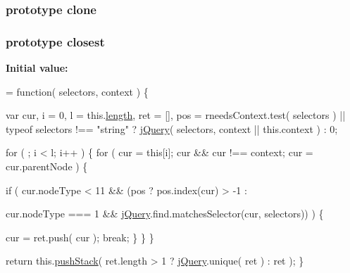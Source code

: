 \hypertarget{jquery-1_810_82-vsdoc_8js_a7d74ce76585989b4b6e2d506577e13ad}{
\subsubsection[{clone}]{ {\bf prototype} clone}}\label{jquery-1_810_82-vsdoc_8js_a7d74ce76585989b4b6e2d506577e13ad}
\hypertarget{jquery-1_810_82-vsdoc_8js_aff450c9c255a1867a5677efa5bed8765}{
\subsubsection[{closest}]{ {\bf prototype} closest}}\label{jquery-1_810_82-vsdoc_8js_aff450c9c255a1867a5677efa5bed8765}
{\bfseries Initial value\-:}
\begin{DoxyCode}
= \textcolor{keyword}{function}( selectors, context ) \{


        var cur,
            i = 0,
            l = this.\hyperlink{jquery-1_810_82-vsdoc_8js_aa7de35d58da66d9944ab9cbe82c19640}{length},
            ret = [],
            pos = rneedsContext.test( selectors ) || typeof selectors !== \textcolor{stringliteral}{"string"} ?
                \hyperlink{jquery-1_810_82-vsdoc_8js_add5237586d970a38a81f990e8eb28c6c}{jQuery}( selectors, context || this.context ) :
                0;

        \textcolor{keywordflow}{for} ( ; i < l; i++ ) \{
            \textcolor{keywordflow}{for} ( cur = \textcolor{keyword}{this}[i]; cur && cur !== context; cur = cur.parentNode ) \{
                
                \textcolor{keywordflow}{if} ( cur.nodeType < 11 && (pos ?
                    pos.index(cur) > -1 :

                    
                    cur.nodeType === 1 &&
                        \hyperlink{jquery-1_810_82-vsdoc_8js_add5237586d970a38a81f990e8eb28c6c}{jQuery}.find.matchesSelector(cur, selectors)) ) \{

                    cur = ret.push( cur );
                    \textcolor{keywordflow}{break};
                \}
            \}
        \}

        \textcolor{keywordflow}{return} this.\hyperlink{jquery-1_810_82-vsdoc_8js_afc3a7db1ef2b526338c06c07cecccd44}{pushStack}( ret.length > 1 ? \hyperlink{jquery-1_810_82-vsdoc_8js_add5237586d970a38a81f990e8eb28c6c}{jQuery}.unique( ret ) : ret );
    \}
\end{DoxyCode}
